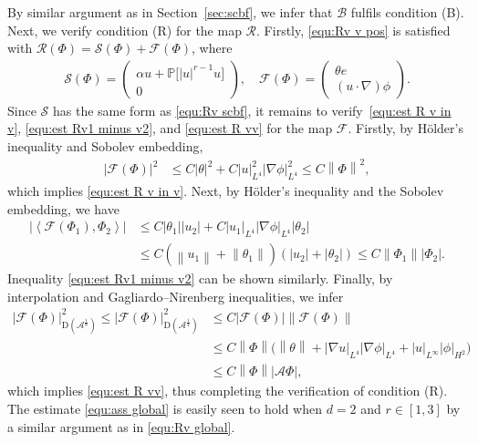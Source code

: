 \documentclass[11pt, reqno]{amsart}
\theoremstyle{definition}
\numberwithin{equation}{section}
\newcommand{\bb}{\mathbb}
\newcommand{\norm}[1]{\left\|{#1}\right\|}
\newcommand{\inpro}[2]{\left\langle#1,#2\right\rangle}
\newcommand{\abs}[1]{\left|{#1}\right|}
\begin{document}
By similar argument as in Section~\ref{sec:scbf}, we infer that $\mathcal{B}$ fulfils condition (B). Next, we verify condition (R) for the map $\mathcal{R}$. Firstly, \eqref{equ:Rv v pos} is satisfied with $\mathcal{R}(\Phi)=\mathcal{S}(\Phi)+ \mathcal{F}(\Phi)$, where
\begin{align*}
    \mathcal{S}(\Phi)= 
    \begin{pmatrix} \alpha u + \bb{P}\big[|u|^{r-1} u\big] \\[0.5ex] 0 \end{pmatrix},
    \quad 
    \mathcal{F}(\Phi)= 
    \begin{pmatrix} \theta e \\[0.5ex] (u\cdot\nabla) \phi \end{pmatrix}.
\end{align*}
Since $\mathcal{S}$ has the same form as \eqref{equ:Rv scbf}, it remains to verify~\eqref{equ:est R v in v}, \eqref{equ:est Rv1 minus v2}, and \eqref{equ:est R vv} for the map $\mathcal{F}$. Firstly, by H\"older's inequality and Sobolev embedding,
\begin{align*}
    \abs{\mathcal{F}(\Phi)}^2
    &\leq 
    C \abs{\theta}^2 + C \abs{u}_{L^4}^2 \abs{\nabla \phi}_{L^4}^2
    \leq
    C\norm{\Phi}^2,
\end{align*}
which implies \eqref{equ:est R v in v}.
Next, by H\"older's inequality and the Sobolev embedding, we have
\begin{align*}
    \abs{\inpro{\mathcal{F}(\Phi_1)}{\Phi_2}}
    &\leq
    C \abs{\theta_1} \abs{u_2} + C \abs{u_1}_{L^4} \abs{\nabla \phi}_{L^4} \abs{\theta_2}
    \\
    &\leq
    C \left(\norm{u_1}+ \norm{\theta_1} \right) \left(\abs{u_2}+ \abs{\theta_2} \right)
    \leq
    C \norm{\Phi_1} \abs{\Phi_2}.
\end{align*}
Inequality \eqref{equ:est Rv1 minus v2} can be shown similarly. Finally, by interpolation and Gagliardo--Nirenberg inequalities, we infer
\begin{align*}
    \abs{\mathcal{F}(\Phi)}_{\mathrm{D}(\mathcal{A}^{\frac18})}^2
    \leq
    \abs{\mathcal{F}(\Phi)}_{\mathrm{D}(\mathcal{A}^{\frac14})}^2
    &\leq
    C \abs{\mathcal{F}(\Phi)} \norm{\mathcal{F}(\Phi)}
    \\
    &\leq
    C\norm{\Phi} \big(\norm{\theta}+ \abs{\nabla u}_{L^4} \abs{\nabla \phi}_{L^4} + \abs{u}_{L^\infty} \abs{\phi}_{H^2} \big)
    \\
    &\leq
    C \norm{\Phi} \abs{\mathcal{A}\Phi},
\end{align*}
which implies \eqref{equ:est R vv}, thus completing the verification of condition (R). The estimate \eqref{equ:ass global} is easily seen to hold when $d=2$ and $r\in [1,3]$ by a similar argument as in \eqref{equ:Rv global}.
\end{document}
